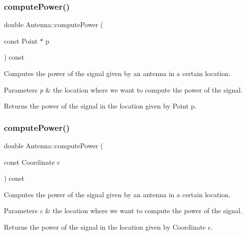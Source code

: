 \subsubsection{\texorpdfstring{computePower()}{computePower()}\hspace{0.1cm}{\footnotesize\ttfamily [1/2]}}
{\footnotesize\ttfamily double Antenna\+::compute\+Power (\begin{DoxyParamCaption}\item[{const Point $\ast$}]{p }\end{DoxyParamCaption}) const}

Computes the power of the signal given by an antenna in a certain location. 
\begin{DoxyParams}{Parameters}
{\em p} & the location where we want to compute the power of the signal. \\
\hline
\end{DoxyParams}
\begin{DoxyReturn}{Returns}
the power of the signal in the location given by Point p. 
\end{DoxyReturn}
\mbox{\label{class_antenna_a0192376f8702c5300fe1f13ce267b305}} 
\subsubsection{\texorpdfstring{computePower()}{computePower()}\hspace{0.1cm}{\footnotesize\ttfamily [2/2]}}
{\footnotesize\ttfamily double Antenna\+::compute\+Power (\begin{DoxyParamCaption}\item[{const Coordinate}]{c }\end{DoxyParamCaption}) const}

Computes the power of the signal given by an antenna in a certain location. 
\begin{DoxyParams}{Parameters}
{\em c} & the location where we want to compute the power of the signal. \\
\hline
\end{DoxyParams}
\begin{DoxyReturn}{Returns}
the power of the signal in the location given by Coordinate c. 
\end{DoxyReturn}
\mbox{\label{class_antenna_a2fab50e7dbe01acec58d7fe89798e9b6}} 

